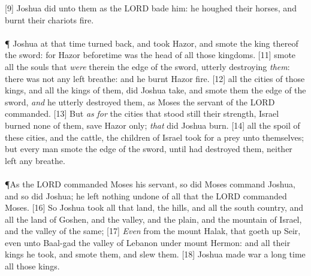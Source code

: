 [9] \textcolor[cmyk]{0.99998,1,0,0}{ Joshua did unto them as the LORD bade him: he houghed their horses, and burnt their chariots  fire.}\\
\\
\P \textcolor[cmyk]{0.99998,1,0,0}{ Joshua at that time turned back, and took Hazor, and smote the king thereof  the sword: for Hazor beforetime was the head of all those kingdoms.}
[11] \textcolor[cmyk]{0.99998,1,0,0}{  smote all the souls that \emph{were} therein  the edge of the sword, utterly destroying \emph{them}: there was not any left  breathe: and he burnt Hazor  fire.}
[12] \textcolor[cmyk]{0.99998,1,0,0}{ all the cities of those kings, and all the kings of them, did Joshua take, and smote them  the edge of the sword, \emph{and} he utterly destroyed them, as Moses the servant of the LORD commanded.}
[13] \textcolor[cmyk]{0.99998,1,0,0}{But \emph{as} \emph{for} the cities that stood still  their strength, Israel burned none of them, save Hazor only; \emph{that} did Joshua burn.}
[14] \textcolor[cmyk]{0.99998,1,0,0}{ all the spoil of these cities, and the cattle, the children of Israel took for a prey unto themselves; but every man  smote  the edge of the sword, until  had destroyed them, neither left  any  breathe.}\\
\\
\P \textcolor[cmyk]{0.99998,1,0,0}{As the LORD commanded Moses his servant, so did Moses command Joshua, and so did Joshua; he left nothing undone of all that the LORD commanded Moses.}
[16] \textcolor[cmyk]{0.99998,1,0,0}{So Joshua took all that land, the hills, and all the south country, and all the land of Goshen, and the valley, and the plain, and the mountain of Israel, and the valley of the same;}
[17] \textcolor[cmyk]{0.99998,1,0,0}{\emph{Even} from the mount Halak, that goeth up  Seir, even unto Baal-gad  the valley of Lebanon under mount Hermon: and all their kings he took, and smote them, and slew them.}
[18] \textcolor[cmyk]{0.99998,1,0,0}{Joshua made war a long time  all those kings.}
